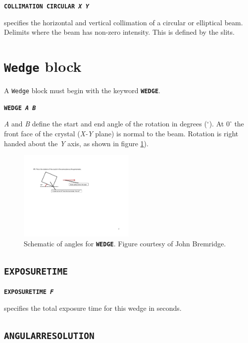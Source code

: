 \documentclass[a4paper]{article}
\newcommand{\Class}[1]{\texttt{#1}\xspace}
\newcommand{\Keyword}[1]{\texttt{\textbf{#1}}\xspace}
\begin{document}
\noindent \Keyword{COLLIMATION CIRCULAR \textit{X Y}}

specifies the horizontal and vertical collimation of a circular or elliptical beam.
Delimits where the beam has non-zero intensity.
This is defined by the slits.

%

\section{\Class{Wedge} block}

A \Class{Wedge} block must begin with the keyword \Keyword{WEDGE}.

\Keyword{WEDGE \textit{A B}}

\textit{A} and \textit{B} define the start and end angle of the rotation in degrees ($^\circ$). At $0^\circ$ the front face of the crystal (\textit{X-Y} plane) is normal to the beam. Rotation is right handed about the \textit{Y} axis, as shown in figure \ref{fig:anglePhi}).
\begin{figure}[h!]
\centering
\includegraphics[width=0.5\textwidth]{Figs-for-Markus-from-JB-19-5-13-3.pdf}
\caption{Schematic of angles for \Keyword{WEDGE}. Figure courtesy of John Bremridge.}
\label{fig:anglePhi}
\end{figure}

\subsection{\Keyword{EXPOSURETIME}}

\noindent \Keyword{EXPOSURETIME \textit{F}}

specifies the total exposure time for this wedge in seconds.



\subsection{\Keyword{ANGULARRESOLUTION}}
\end{document}

